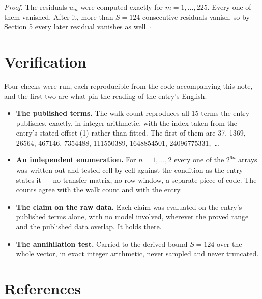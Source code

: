 \documentclass[11pt]{article}
\theoremstyle{definition}
\begin{document}
{\itshape Proof.} The residuals $u_m$ were computed exactly for $m = 1,\dots,225$. Every one of them vanished. After it, more than $S = 124$ consecutive residuals vanish, so by Section 5 every later residual vanishes as well. $\square$

\section{Verification}

Four checks were run, each reproducible from the code accompanying this note, and the first two are what pin the reading of the entry's English.

\begin{itemize}

\item {\bfseries The published terms.} The walk count reproduces all 15 terms the entry publishes, exactly, in integer arithmetic, with the index taken from the entry's stated offset (1) rather than fitted. The first of them are 37, 1369, 26564, 467146, 7354488, 111550389, 1648854501, 24096775331,~\dots

\item {\bfseries An independent enumeration.} For $n = 1,\dots,2$ every one of the $2^{6n}$ arrays was written out and tested cell by cell against the condition as the entry states it --- no transfer matrix, no row window, a separate piece of code. The counts agree with the walk count and with the entry.

\item {\bfseries The claim on the raw data.} Each claim was evaluated on the entry's published terms alone, with no model involved, wherever the proved range and the published data overlap. It holds there.

\item {\bfseries The annihilation test.} Carried to the derived bound $S = 124$ over the whole vector, in exact integer arithmetic, never sampled and never truncated.

\end{itemize}

\section{References}
\end{document}
